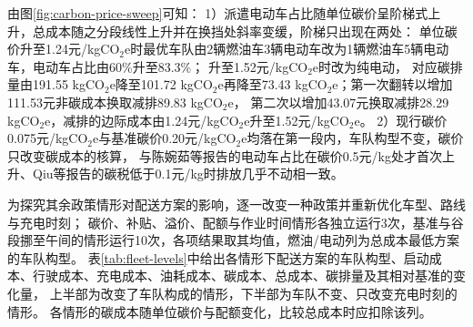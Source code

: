 
由图\ref{fig:carbon-price-sweep}可知：
1）派遣电动车占比随单位碳价呈阶梯式上升，总成本随之分段线性上升并在换挡处斜率变缓，阶梯只出现在两处：
单位碳价升至1.24元/kgCO$_2$e时最优车队由2辆燃油车3辆电动车改为1辆燃油车5辆电动车，电动车占比由60\%升至83.3\%；
升至1.52元/kgCO$_2$e时改为纯电动，
对应碳排量由191.55 kgCO$_2$e降至101.72 kgCO$_2$e再降至73.43 kgCO$_2$e；第一次翻转以增加111.53元非碳成本换取减排89.83 kgCO$_2$e，
第二次以增加43.07元换取减排28.29 kgCO$_2$e，减排的边际成本由1.24元/kgCO$_2$e升至1.52元/kgCO$_2$e。
2）现行碳价0.075元/kgCO$_2$e与基准碳价0.20元/kgCO$_2$e均落在第一段内，车队构型不变，碳价只改变碳成本的核算，
与陈婉茹等\cite{ref:23}报告的电动车占比在碳价0.5元/kg处才首次上升、Qiu等\cite{ref:qiu2024}报告的碳税低于0.1元/kg时排放几乎不动相一致。

为探究其余政策情形对配送方案的影响，逐一改变一种政策并重新优化车型、路线与充电时刻；
碳价、补贴、溢价、配额与作业时间情形各独立运行3次，基准与谷段挪至午间的情形运行10次，各项结果取其均值，燃油/电动列为总成本最低方案的车队构型。
表\ref{tab:fleet-levels}中给出各情形下配送方案的车队构型、启动成本、行驶成本、充电成本、油耗成本、碳成本、总成本、碳排量及其相对基准的变化量，
上半部为改变了车队构成的情形，下半部为车队不变、只改变充电时刻的情形。
各情形的碳成本随单位碳价与配额变化，比较总成本时应扣除该列。


